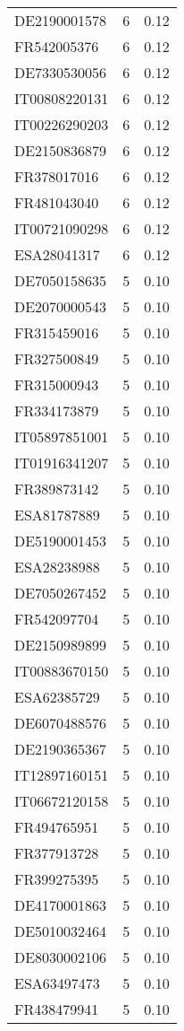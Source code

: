 \begin{table*}[htbp]
\begin{tabular}{lrr}
DE2190001578 & 6 & 0.12 \\
FR542005376 & 6 & 0.12 \\
DE7330530056 & 6 & 0.12 \\
IT00808220131 & 6 & 0.12 \\
IT00226290203 & 6 & 0.12 \\
DE2150836879 & 6 & 0.12 \\
FR378017016 & 6 & 0.12 \\
FR481043040 & 6 & 0.12 \\
IT00721090298 & 6 & 0.12 \\
ESA28041317 & 6 & 0.12 \\
DE7050158635 & 5 & 0.10 \\
DE2070000543 & 5 & 0.10 \\
FR315459016 & 5 & 0.10 \\
FR327500849 & 5 & 0.10 \\
FR315000943 & 5 & 0.10 \\
FR334173879 & 5 & 0.10 \\
IT05897851001 & 5 & 0.10 \\
IT01916341207 & 5 & 0.10 \\
FR389873142 & 5 & 0.10 \\
ESA81787889 & 5 & 0.10 \\
DE5190001453 & 5 & 0.10 \\
ESA28238988 & 5 & 0.10 \\
DE7050267452 & 5 & 0.10 \\
FR542097704 & 5 & 0.10 \\
DE2150989899 & 5 & 0.10 \\
IT00883670150 & 5 & 0.10 \\
ESA62385729 & 5 & 0.10 \\
DE6070488576 & 5 & 0.10 \\
DE2190365367 & 5 & 0.10 \\
IT12897160151 & 5 & 0.10 \\
IT06672120158 & 5 & 0.10 \\
FR494765951 & 5 & 0.10 \\
FR377913728 & 5 & 0.10 \\
FR399275395 & 5 & 0.10 \\
DE4170001863 & 5 & 0.10 \\
DE5010032464 & 5 & 0.10 \\
DE8030002106 & 5 & 0.10 \\
ESA63497473 & 5 & 0.10 \\
FR438479941 & 5 & 0.10 \\

\end{tabular}
\end{table*}
